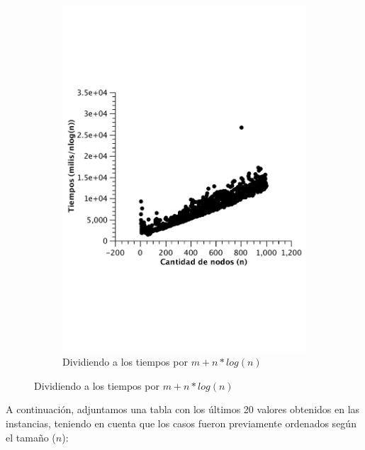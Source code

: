 \begin{figure}[H]
        \begin{subfigure}[b]{0.5\textwidth}
                \includegraphics[width=\textwidth]{imagenes/vacio-matriz-4.pdf}
                \caption{Dividiendo a los tiempos por $m + n*log(n)$}
        \end{subfigure}
\end{figure}

A continuación, adjuntamos una tabla con los últimos 20 valores obtenidos en las instancias, teniendo en cuenta que los casos fueron previamente ordenados según el tamaño ($n$):

